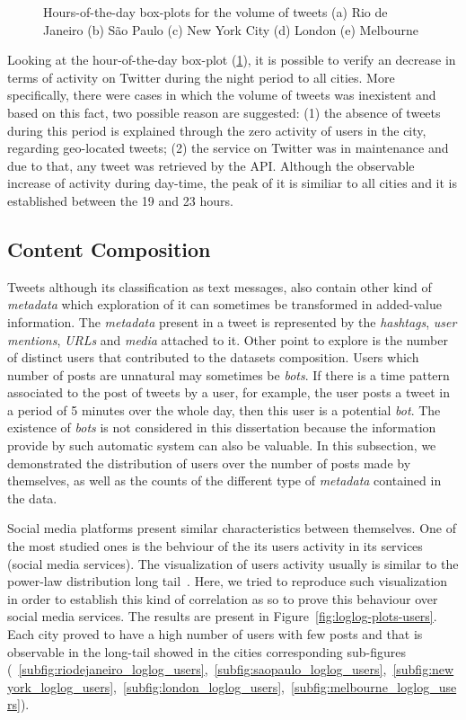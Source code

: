 \begin{figure}[htbp]
	\caption[Five numerical solutions]{Hours-of-the-day box-plots for the volume of tweets (a) Rio de Janeiro (b) São Paulo (c) New York City (d) London (e) Melbourne}
	\label{fig:box_plots_hour_of_day}
\end{figure}

Looking at the hour-of-the-day box-plot (\ref{fig:box_plots_hour_of_day}), it is possible to verify an decrease in terms of activity on Twitter during the night period to all cities. More specifically, there were cases in which the volume of tweets was inexistent and based on this fact, two possible reason are suggested: (1) the absence of tweets during this period is explained through the zero activity of users in the city, regarding geo-located tweets; (2) the service on Twitter was in maintenance and due to that, any tweet was retrieved by the API. Although the observable increase of activity during day-time, the peak of it is similiar to all cities and it is established between the 19 and 23 hours.

\subsection{Content Composition}

Tweets although its classification as text messages, also contain other kind of \textit{metadata} which exploration of it can sometimes be transformed in added-value information. The \textit{metadata} present in a tweet is represented by the \textit{hashtags}, \textit{user mentions}, \textit{URLs} and \textit{media} attached to it. Other point to explore is the number of distinct users that contributed to the datasets composition. Users which number of posts are unnatural may sometimes be \textit{bots}. If there is a time pattern associated to the post of tweets by a user, for example, the user posts a tweet in a period of 5 minutes over the whole day, then this user is a potential \textit{bot}. The existence of \textit{bots} is not considered in this dissertation because the information provide by such automatic system can also be valuable. In this subsection, we demonstrated the distribution of users over the number of posts made by themselves, as well as the counts of the different type of \textit{metadata }contained in the data. 

Social media platforms present similar characteristics between themselves. One of the most studied ones is the behviour of the its users activity in its services (social media services). The visualization of users activity usually is similar to the power-law distribution long tail~\cite{muchnik2013origins}. Here, we tried to reproduce such visualization in order to establish this kind of correlation as so to prove this behaviour over social media services. The results are present in Figure~\ref{fig:loglog-plots-users}. Each city proved to have a high number of users with few posts and that is observable in the long-tail showed in the cities corresponding sub-figures (~\ref{subfig:riodejaneiro_loglog_users},~\ref{subfig:saopaulo_loglog_users},~\ref{subfig:newyork_loglog_users},~\ref{subfig:london_loglog_users},~\ref{subfig:melbourne_loglog_users}).

